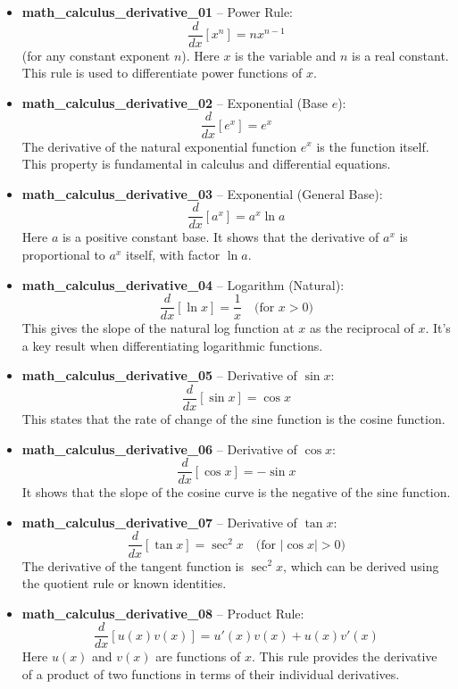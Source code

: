\documentclass[11pt,a4paper]{article}
\begin{document}
\begin{itemize}
\item \textbf{math\_calculus\_derivative\_01} -- Power Rule: 
\[\frac{d}{dx}[x^n] = nx^{n-1}\]
(for any constant exponent $n$). Here $x$ is the variable and $n$ is a real constant. This rule is used to differentiate power functions of $x$.

\item \textbf{math\_calculus\_derivative\_02} -- Exponential (Base $e$): 
\[\frac{d}{dx}[e^x] = e^x\]
The derivative of the natural exponential function $e^x$ is the function itself. This property is fundamental in calculus and differential equations.

\item \textbf{math\_calculus\_derivative\_03} -- Exponential (General Base): 
\[\frac{d}{dx}[a^x] = a^x \ln a\]
Here $a$ is a positive constant base. It shows that the derivative of $a^x$ is proportional to $a^x$ itself, with factor $\ln a$.

\item \textbf{math\_calculus\_derivative\_04} -- Logarithm (Natural): 
\[\frac{d}{dx}[\ln x] = \frac{1}{x} \quad \text{(for } x>0\text{)}\]
This gives the slope of the natural log function at $x$ as the reciprocal of $x$. It's a key result when differentiating logarithmic functions.

\item \textbf{math\_calculus\_derivative\_05} -- Derivative of $\sin x$: 
\[\frac{d}{dx}[\sin x] = \cos x\]
This states that the rate of change of the sine function is the cosine function.

\item \textbf{math\_calculus\_derivative\_06} -- Derivative of $\cos x$: 
\[\frac{d}{dx}[\cos x] = -\sin x\]
It shows that the slope of the cosine curve is the negative of the sine function.

\item \textbf{math\_calculus\_derivative\_07} -- Derivative of $\tan x$: 
\[\frac{d}{dx}[\tan x] = \sec^2 x \quad \text{(for } |\cos x|>0\text{)}\]
The derivative of the tangent function is $\sec^2 x$, which can be derived using the quotient rule or known identities.

\item \textbf{math\_calculus\_derivative\_08} -- Product Rule: 
\[\frac{d}{dx}[u(x)v(x)] = u'(x)v(x) + u(x)v'(x)\]
Here $u(x)$ and $v(x)$ are functions of $x$. This rule provides the derivative of a product of two functions in terms of their individual derivatives.


\end{itemize}
\end{document}
